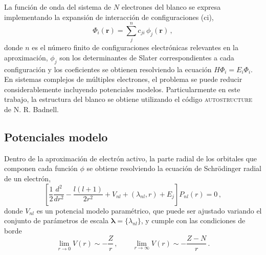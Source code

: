 La función de onda del sistema de $N$ electrones del blanco se expresa 
implementando la expansión de interacción de configuraciones (\acs{ci}),
\begin{equation*}
\Phi_i(\mathbf{r})=\sum_j^{n} c_{ji} \, \phi_j(\mathbf{r})\,,
\label{eq:phi-RM}
\end{equation*}
donde $n$ es el número finito de configuraciones electrónicas relevantes 
en la aproximación, $\phi_j$ son los determinantes de Slater 
correspondientes a cada configuración y los coeficientes se obtienen 
resolviendo la ecuación $H\Phi_i=E_i\Phi_i$. En sistemas complejos de 
múltiples electrones, el problema se puede reducir considerablemente 
incluyendo potenciales modelos. 
Particularmente en este trabajo, la estructura del blanco se obtiene
utilizando el código \textsc{autostructure}~\cite{Badnell:11} de 
N. R. Badnell. 

\subsection{Potenciales modelo}
\label{subsec:potmod-rmatrix}

Dentro de la aproximación de electrón activo, la parte radial de los 
orbitales que componen cada función $\phi$ se obtiene resolviendo la 
ecuación de Schr\"odinger radial de un electrón,
\begin{equation*}
\left[ \frac{1}{2} \frac{d^2}{dr^2} - \frac{l(l+1)}{2r^2} 
 + V_{nl}+(\lambda_{nl},r) + E_j \right] P_{nl}(r)=0\,,
\label{eq:Schro-potmod}
\end{equation*}
donde $V_{nl}$ es un potencial modelo paramétrico, que puede ser 
ajustado variando el conjunto de parámetros de escala 
$\boldsymbol\lambda=\{\lambda_{nl}\}$, y cumple con las condiciones de 
borde
\begin{equation}
\lim_{r \rightarrow 0} V(r) \sim -\frac{Z}{r} \,,\qquad
\lim_{r \rightarrow \infty} V(r) \sim -\frac{Z-N}{r} \,.
\end{equation}

